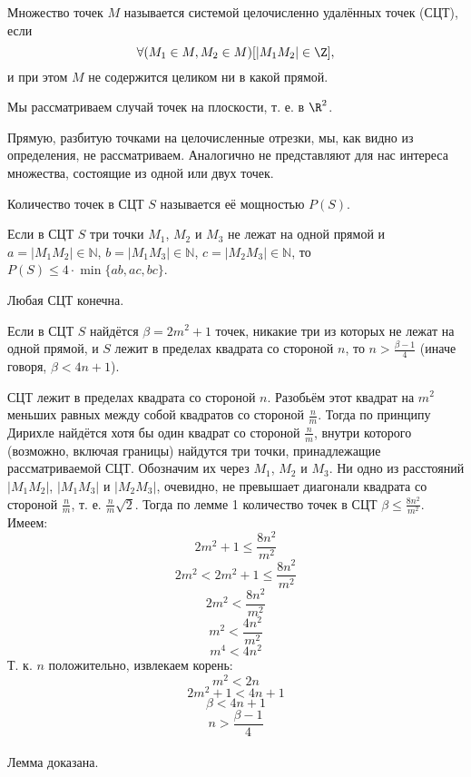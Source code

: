 \documentclass[a4paper,14pt]{article}
\begin{document}
\large

\begin{opr}
	Множество точек $M$ называется системой целочисленно удалённых точек (СЦТ), если
	$$
		\forall(M_1 \in M, M_2\in M)[|M_1 M_2|\in\Z],
	$$
	и при этом $M$ не содержится целиком ни в какой прямой.
\end{opr}

\begin{zamech}
	Мы рассматриваем случай точек на плоскости, т. е. в $\R^2$.
\end{zamech}

\begin{zamech}
	Прямую, разбитую точками на целочисленные отрезки, мы, как видно из определения, не рассматриваем.
	Аналогично не представляют для нас интереса множества, состоящие из одной или двух точек.
\end{zamech}

\begin{opr}
	Количество точек в СЦТ $S$ называется её мощностью $P(S)$.
\end{opr}

\begin{lemma}\label{lemma_Semenova}
	Если в СЦТ $S$ три точки $M_1$, $M_2$ и $M_3$ не лежат на одной прямой и 
	$a=|M_1 M_2| \in \mathbb{N}$,
	$b=|M_1 M_3| \in \mathbb{N}$,
	$c=|M_2 M_3| \in \mathbb{N}$,
	то 
	$P(S) \leq 4\cdot\min\{ab,ac,bc\}$.
\end{lemma}

\begin{sledstvie}
	Любая СЦТ конечна.
\end{sledstvie}

\begin{lemma}\label{lemma_ocenka_bestriad_1}
	Если в СЦТ $S$ найдётся $\beta = 2m^2 +1$ точек, никакие три из которых не лежат на одной прямой,
	и $S$ лежит в пределах квадрата со стороной $n$,
	то $n > \frac{\beta - 1}{4}$ (иначе говоря, $ \beta < 4n +1$).
\end{lemma}

\dokvo
	СЦТ лежит в пределах квадрата со стороной $n$.
	Разобьём этот квадрат на $m^2$ меньших равных между собой квадратов со стороной $\frac{n}{m}$.
	Тогда по принципу Дирихле найдётся хотя бы один квадрат со стороной $\frac{n}{m}$,
	внутри которого (возможно, включая границы) найдутся три точки, принадлежащие рассматриваемой СЦТ.
	Обозначим их через $M_1$, $M_2$ и $M_3$.
	Ни одно из расстояний $|M_1 M_2|$, $|M_1 M_3|$ и $|M_2 M_3|$, очевидно, не превышает диагонали квадрата со стороной $\frac{n}{m}$,
	т. е. $\frac{n}{m}\sqrt{2}$.
	Тогда по лемме 1 количество точек в СЦТ $\beta \le \frac{8n^2}{m^2}$.
	Имеем:
	$$ 2m^2+1 \le \frac{8n^2}{m^2}$$
	$$ 2m^2 < 2m^2+1 \le \frac{8n^2}{m^2}$$
	$$ 2m^2 < \frac{8n^2}{m^2}$$
	$$ m^2 < \frac{4n^2}{m^2}$$
	$$ m^4 < 4n^2$$
	Т. к. $n$ положительно, извлекаем корень:
	$$ m^2 < 2n$$
	$$ 2m^2 +1 < 4n +1$$
	$$ \beta < 4n +1$$
	$$n > \frac{\beta - 1}{4}$$
\\ Лемма доказана.
\end{document}
